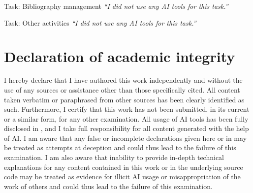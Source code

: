 \documentclass[11pt]{article}
\begin{document}
\begin{answerbox}{Task: Bibliography management}
  \textit{``I did not use any AI tools for this task.''}
\end{answerbox}

\vspace{.25em}

\begin{answerbox}{Task: Other activities}
  \textit{``I did not use any AI tools for this task.''}
\end{answerbox}

\clearpage

\section{Declaration of academic integrity}\label{sec:declaration}

I hereby declare that I have authored this work independently and
without the use of any sources or assistance other than those
specifically cited. All content taken verbatim or paraphrased from
other sources has been clearly identified as such. Furthermore, I
certify that this work has not been submitted, in its current or a
similar form, for any other examination. All usage of AI tools has
been fully disclosed in , and I take full
responsibility for all content generated with the help of AI. I am
aware that any false or incomplete declarations given here or in
 may be treated as attempts at deception and
could thus lead to the failure of this examination. I am also aware
that inability to provide in-depth technical explanations for any
content contained in this work or in the underlying source code may
be treated as evidence for illicit AI usage or misappropriation of
the work of others and could thus lead to the failure of this examination.

\end{document}
